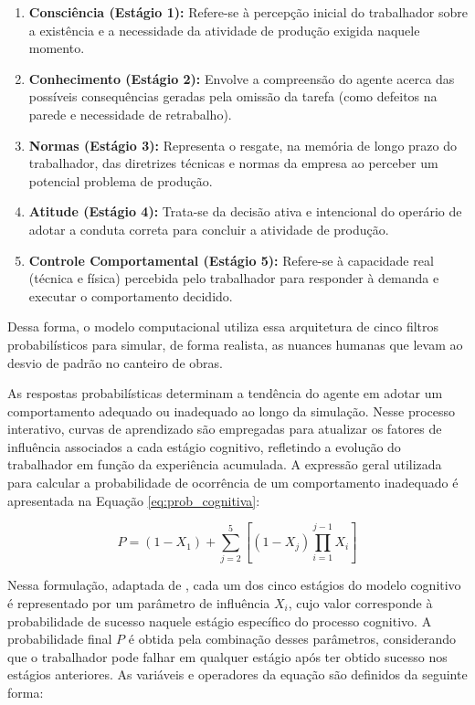 \begin{enumerate}
	\item \textbf{Consciência (Estágio 1):} Refere-se à percepção inicial do trabalhador sobre a existência e a necessidade da atividade de produção exigida naquele momento.
	\item \textbf{Conhecimento (Estágio 2):} Envolve a compreensão do agente acerca das possíveis consequências geradas pela omissão da tarefa (como defeitos na parede e necessidade de retrabalho).
	\item \textbf{Normas (Estágio 3):} Representa o resgate, na memória de longo prazo do trabalhador, das diretrizes técnicas e normas da empresa ao perceber um potencial problema de produção.
	\item \textbf{Atitude (Estágio 4):} Trata-se da decisão ativa e intencional do operário de adotar a conduta correta para concluir a atividade de produção.
	\item \textbf{Controle Comportamental (Estágio 5):} Refere-se à capacidade real (técnica e física) percebida pelo trabalhador para responder à demanda e executar o comportamento decidido.
\end{enumerate}

Dessa forma, o modelo computacional utiliza essa arquitetura de cinco filtros probabilísticos para simular, de forma realista, as nuances humanas que levam ao desvio de padrão no canteiro de obras.

As respostas probabilísticas determinam a tendência do agente em adotar um comportamento adequado ou inadequado ao longo da simulação. Nesse processo interativo, curvas de aprendizado são empregadas para atualizar os fatores de influência associados a cada estágio cognitivo, refletindo a evolução do trabalhador em função da experiência acumulada. A expressão geral utilizada para calcular a probabilidade de ocorrência de um comportamento inadequado é apresentada na Equação \ref{eq:prob_cognitiva}:

\begin{equation}
	P = (1 - X_1) + \sum_{j=2}^{5} \left[ (1 - X_j) \prod_{i=1}^{j-1} X_i \right]
	\label{eq:prob_cognitiva}
\end{equation}

Nessa formulação, adaptada de , cada um dos cinco estágios do modelo cognitivo é representado por um parâmetro de influência $X_i$, cujo valor corresponde à probabilidade de sucesso naquele estágio específico do processo cognitivo. A probabilidade final $P$ é obtida pela combinação desses parâmetros, considerando que o trabalhador pode falhar em qualquer estágio após ter obtido sucesso nos estágios anteriores. As variáveis e operadores da equação são definidos da seguinte forma:

